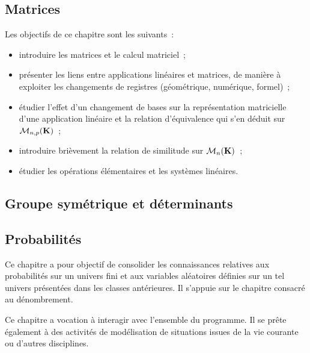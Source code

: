 \subsection{Matrices}
\begin{itshape}
Les objectifs de ce chapitre sont les suivants~:
\begin{itemize}
\item introduire les matrices et le calcul matriciel~;
\item présenter les liens entre applications linéaires et matrices, de manière à exploiter les changements de registres (géométrique, numérique, formel)~;
\item étudier l'effet d'un changement de bases sur la représentation matricielle d'une application linéaire et la relation d'équivalence qui s'en déduit sur $\mathcal M_{n,p}(\mathbf{K})$~;
\item introduire brièvement la relation de similitude sur $\mathcal M_{n}(\mathbf{K})$~;
\item étudier les opérations élémentaires et les systèmes linéaires.
\end{itemize}
\end{itshape}


\setcounter{subsubsection}{0}





\subsection{Groupe symétrique et déterminants}
\setcounter{subsubsection}{0}








\subsection{Probabilités}
\begin{itshape}
Ce chapitre  a pour objectif de consolider les connaissances  relatives aux probabilités sur un univers fini et aux variables aléatoires définies sur un tel univers présentées dans les classes antérieures. Il s'appuie sur le chapitre consacré au dénombrement.

Ce chapitre  a vocation à interagir avec l'ensemble du programme. Il se prête également à des activités de modélisation de situations issues de la vie courante ou d'autres disciplines.
\end{itshape}
\setcounter{subsubsection}{0}



